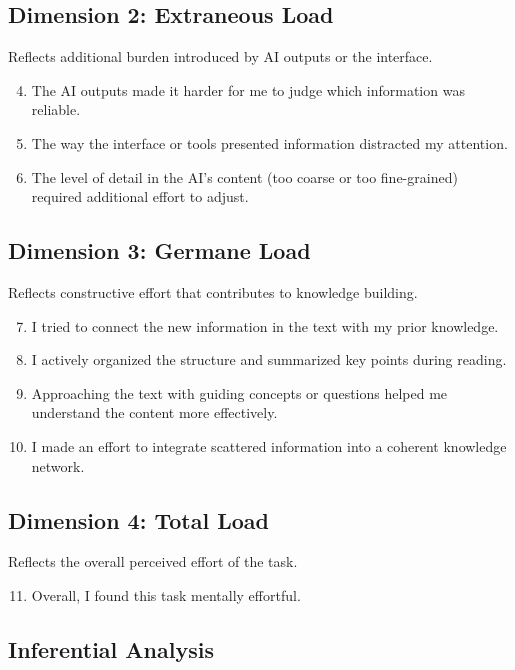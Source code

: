 \documentclass[manuscript,review,anonymous]{acmart}
\begin{document}
\subsection*{Dimension 2: Extraneous Load}
Reflects additional burden introduced by AI outputs or the interface.
\begin{enumerate}[label=\arabic*.]
 \setcounter{enumi}{3}
 \item The AI outputs made it harder for me to judge which information was reliable.
 \item The way the interface or tools presented information distracted my attention.
 \item The level of detail in the AI’s content (too coarse or too fine-grained) required additional effort to adjust.
\end{enumerate}

\subsection*{Dimension 3: Germane Load}
Reflects constructive effort that contributes to knowledge building.
\begin{enumerate}[label=\arabic*.]
 \setcounter{enumi}{6}
 \item I tried to connect the new information in the text with my prior knowledge.
 \item I actively organized the structure and summarized key points during reading.
 \item Approaching the text with guiding concepts or questions helped me understand the content more effectively.
 \item I made an effort to integrate scattered information into a coherent knowledge network.
\end{enumerate}

\subsection*{Dimension 4: Total Load}
Reflects the overall perceived effort of the task.
\begin{enumerate}[label=\arabic*.]
 \setcounter{enumi}{10}
 \item Overall, I found this task mentally effortful.
\end{enumerate}

\subsection{Inferential Analysis}
\label{appendix:clt-inferential}
\end{document}
